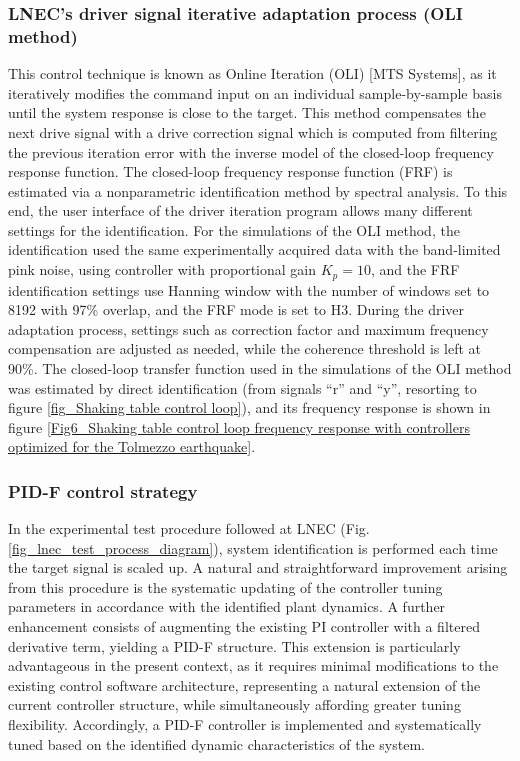 \documentclass[  10pt, twoside]{report} %
\numberwithin{equation}{chapter}
\begin{document}
\subsubsection{LNEC's driver signal iterative adaptation process (OLI method)}
This control technique is known as Online Iteration (OLI) [MTS Systems], as it iteratively modifies the command input on an individual sample-by-sample basis until the system response is close to the target. 
This method compensates the next drive signal with a drive correction signal which is computed from filtering the previous iteration error with the inverse model of the closed-loop frequency response function. The closed-loop frequency response function (FRF) is estimated via a nonparametric identification method by spectral analysis. To this end, the user interface of the driver iteration program allows many different settings for the identification. For the simulations of the OLI method, the identification used the same experimentally acquired data with the band-limited pink noise, using controller with proportional gain $K_p=10$, and the FRF identification settings use Hanning window with the number of windows set to 8192 with 97\% overlap, and the FRF mode is set to H3. During the driver adaptation process, settings such as correction factor and maximum frequency compensation are adjusted as needed, while the coherence threshold is left at 90\%.
The closed-loop transfer function used in the simulations of the OLI method was estimated by direct identification (from signals “r” and “y”, resorting to figure \ref{fig_Shaking table control loop}), and its frequency response is shown in figure \ref{Fig6_Shaking table control loop frequency response with controllers optimized for the Tolmezzo earthquake}.

\subsubsection{ PID-F control strategy}
In the experimental test procedure followed at LNEC (Fig. \ref{fig_lnec_test_process_diagram}), system identification is performed each time the target signal is scaled up. A natural and straightforward improvement arising from this procedure is the systematic updating of the controller tuning parameters in accordance with the identified plant dynamics. A further enhancement consists of augmenting the existing PI controller with a filtered derivative term, yielding a PID-F structure. This extension is particularly advantageous in the present context, as it requires minimal modifications to the existing control software architecture, representing a natural extension of the current controller structure, while simultaneously affording greater tuning flexibility. Accordingly, a PID-F controller is implemented and systematically tuned based on the identified dynamic characteristics of the system.
\end{document}
